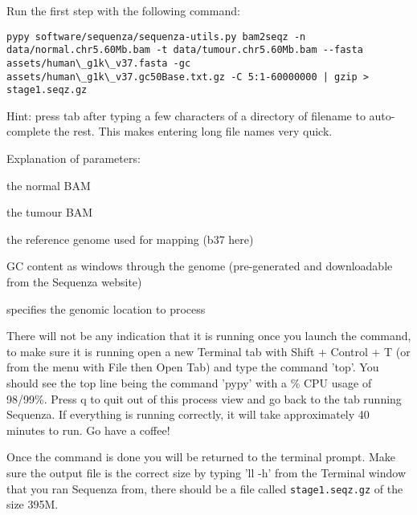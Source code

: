 \begin{steps}
Run the first step with the following command:
\begin{lstlisting}
pypy software/sequenza/sequenza-utils.py bam2seqz -n data/normal.chr5.60Mb.bam -t data/tumour.chr5.60Mb.bam --fasta assets/human\_g1k\_v37.fasta -gc assets/human\_g1k\_v37.gc50Base.txt.gz -C 5:1-60000000 | gzip > stage1.seqz.gz
\end{lstlisting}
\end{steps}

Hint: press tab after typing a few characters of a directory of filename to auto-complete the rest. This makes entering long file names very quick.

\newpage

Explanation of parameters:
\begin{note}
\begin{description}[style=multiline,labelindent=0cm,align=right,leftmargin=\descriptionlabelspace,rightmargin=1.5cm,font=\ttfamily]
 \item[-n] the normal BAM
 \item[-t] the tumour BAM
 \item[--fasta] the reference genome used for mapping (b37 here)
 \item[-gc] GC content as windows through the genome (pre-generated and downloadable from the Sequenza website)
 \item[-C] specifies the genomic location to process
\end{description}
\end{note}

\begin{warning}
There will not be any indication that it is running once you launch the command, to make sure it is running open a new Terminal tab with Shift + Control + T (or from the menu with File then Open Tab) and type the command 'top'. You should see the top line being the command 'pypy' with a \% CPU usage of 98/99\%. Press q to quit out of this process view and go back to the tab running Sequenza. If everything is running correctly, it will take approximately 40 minutes to run. Go have a coffee!
\end{warning}

Once the command is done you will be returned to the terminal prompt. Make sure the output file is the correct size by typing 'll -h' from the Terminal window that you ran Sequenza from, there should be a file called \texttt{stage1.seqz.gz} of the size 395M.\\

